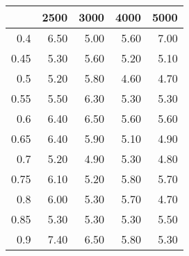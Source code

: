 \begin{table}[ht]
\centering
\begin{tabular}{rrrrr}
  \hline
 & 2500 & 3000 & 4000 & 5000 \\ 
  \hline
0.4 & 6.50 & 5.00 & 5.60 & 7.00 \\ 
  0.45 & 5.30 & 5.60 & 5.20 & 5.10 \\ 
  0.5 & 5.20 & 5.80 & 4.60 & 4.70 \\ 
  0.55 & 5.50 & 6.30 & 5.30 & 5.30 \\ 
  0.6 & 6.40 & 6.50 & 5.60 & 5.60 \\ 
  0.65 & 6.40 & 5.90 & 5.10 & 4.90 \\ 
  0.7 & 5.20 & 4.90 & 5.30 & 4.80 \\ 
  0.75 & 6.10 & 5.20 & 5.80 & 5.70 \\ 
  0.8 & 6.00 & 5.30 & 5.70 & 4.70 \\ 
  0.85 & 5.30 & 5.30 & 5.30 & 5.50 \\ 
  0.9 & 7.40 & 6.50 & 5.80 & 5.30 \\ 
   \hline
\end{tabular}
\end{table}

